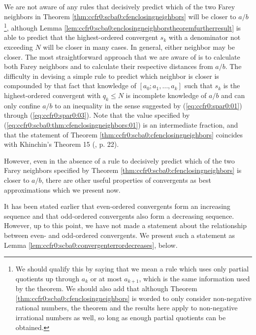 We are not aware of any rules that decisively predict which of the two
Farey neighbors in Theorem \ref{thm:ccfr0:scba0:cfenclosingneighbors}
will be closer to $a/b$\footnote{We should qualify this by saying that
we mean a rule which uses only partial quotients up through
$a_k$ or at most $a_{k+1}$, which is the same information used
by the theorem.  We should also add that although Theorem
\ref{thm:ccfr0:scba0:cfenclosingneighbors} is worded to only consider
non-negative rational numbers, the theorem and the results here
apply to non-negative irrational numbers as well, so long as enough partial
quotients can be obtained.}, although Lemma
\ref{lem:ccfr0:scba0:enclosingneighborstheoremfurtherresult} is able
to predict that the highest-ordered convergent $s_k$ with a denominator
not exceeding $N$ will be closer in many cases.
In general, either neighbor may be closer.
The most straightforward approach that we
are aware of is to calculate both Farey neighbors and to calculate
their respective distances from $a/b$.  The difficulty in devising a simple rule
to predict which neighbor 
is closer is compounded by that fact that knowledge of 
$[a_0; a_1, \ldots{} , a_k]$ such that $s_k$ is the highest-ordered
convergent with $q_k \leq N$ is incomplete knowledge of $a/b$ and can
only confine $a/b$ to an inequality in the sense suggested by
(\ref{eq:ccfr0:spar0:01}) through
(\ref{eq:ccfr0:spar0:03}).  Note that the
value specified by (\ref{eq:ccfr0:scba0:thm:cfenclosingneighbors:01})
is an intermediate fraction, and that the statement of Theorem 
\ref{thm:ccfr0:scba0:cfenclosingneighbors}
coincides with Khinchin's Theorem 15 
(\cite{bibref:b:KhinchinClassic}, p. 22).

However, even in the absence of a rule to decisively
predict which of the
two Farey neighbors specified by Theorem
\ref{thm:ccfr0:scba0:cfenclosingneighbors} is closer to $a/b$,
there are other useful properties of convergents 
as best approximations which we present
now.

It has been stated earlier that even-ordered convergents form an
increasing sequence and that odd-ordered convergents also form a 
decreasing sequence.  However, up to this point, we have not made
a statement about the relationship between even- and odd-ordered
convergents.  We present such a statement as Lemma
\ref{lem:ccfr0:scba0:convergenterrordecreases},
below.

